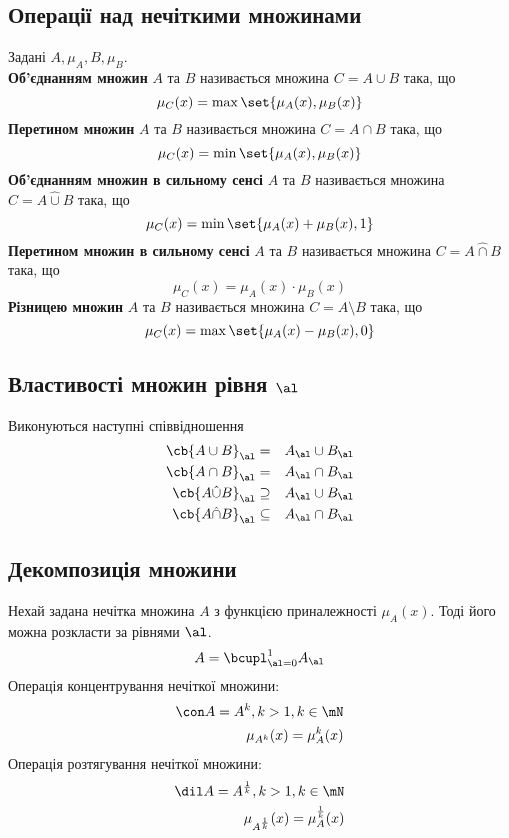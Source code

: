\subsection{Операції над нечіткими множинами}
Задані $A,\mu_A,B,\mu_B$.\\
\textbf{Об'єднанням множин} $A$ та $B$ називається множина $C=A\cup B$ така, що 
\begin{equation}
\mu_C(x) = \max\set{\mu_A(x),\mu_B(x)}
\end{equation}
\textbf{Перетином множин} $A$ та $B$ називається множина $C=A\cap B$ така, що 
\begin{equation}
\mu_C(x) = \min\set{\mu_A(x),\mu_B(x)}
\end{equation}
\textbf{Об'єднанням множин в сильному сенсі} $A$ та $B$ називається множина $C=A\hat\cup B$ така, що 
\begin{equation}
\mu_C(x) = \min\set{\mu_A(x)+\mu_B(x),1}
\end{equation}
\textbf{Перетином множин в сильному сенсі} $A$ та $B$ називається множина $C=A\hat\cap B$ така, що 
\begin{equation}
\mu_C(x) = \mu_A(x)\cdot \mu_B(x)
\end{equation}
\textbf{Різницею множин} $A$ та $B$ називається множина $C=A\setminus B$ така, що 
\begin{equation}
\mu_C(x) = \max\set{\mu_A(x)-\mu_B(x),0}
\end{equation}
\subsection{Властивості множин рівня $\al$}
Виконуються наступні співвідношення
\begin{eqnarray}
\cb{A\cup B}_\al &=& A_\al\cup B_\al\\
\cb{A\cap B}_\al &=& A_\al\cap B_\al\\
\cb{A\hat\cup B}_\al &\supseteq & A_\al \cup B_\al\\
\cb{A\hat\cap B}_\al &\subseteq& A_\al\cap B_\al
\end{eqnarray}
\subsection{Декомпозиція множини}
Нехай задана нечітка множина $A$ з функцією приналежності $\mu_A(x)$. Тоді його можна розкласти за рівнями $\al$.
\begin{equation}
A = \bcupl_{\al=0}^1 A_\al
\end{equation}
Операція концентрування нечіткої множини:
\begin{eqnarray}
\con A = A^k,k>1,k\in\mN\\
\mu_{A^k} (x)= \mu_A^k (x)
\end{eqnarray}
Операція розтягування нечіткої множини:
\begin{eqnarray}
\dil A = A^{\frac1k},k>1,k\in\mN\\
\mu_{A^{\frac1k}} (x)= \mu_A^{\frac1k} (x)
\end{eqnarray}

